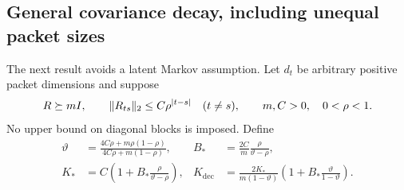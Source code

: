 \subsection{General covariance decay, including unequal packet sizes}
\label{subsec:general-decay}
The next result avoids a latent Markov assumption. Let $d_t$ be arbitrary
positive packet dimensions and suppose
\begin{equation}
 R\succeq mI,\qquad \lVert R_{ts}\rVert_2\le C\rho^{|t-s|}\quad(t\ne s),
 \qquad m,C>0,\quad 0<\rho<1.
 \label{eq:decay-promises}
\end{equation}
No upper bound on diagonal blocks is imposed. Define
\begin{align}
 \vartheta&=\frac{4C\rho+m\rho(1-\rho)}{4C\rho+m(1-\rho)},&
 B_*&=\frac{2C}{m}\frac{\rho}{\vartheta-\rho},\nonumber\\
 K_*&=C\left(1+B_*\frac{\rho}{\vartheta-\rho}\right),&
 K_{\mathrm{dec}}&=\frac{2K_*}{m(1-\vartheta)}
            \left(1+B_*\frac{\vartheta}{1-\vartheta}\right).
 \label{eq:decay-constants}
\end{align}

